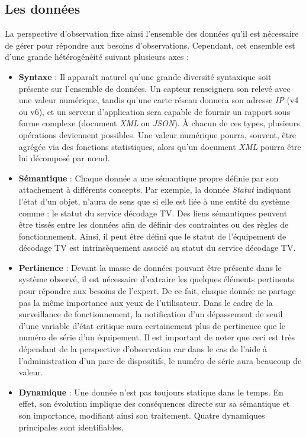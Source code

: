 \subsection{Les données}\label{sec:intro:problematique:data}
La perspective d'observation fixe ainsi l'ensemble des données qu'il est nécessaire de gérer pour répondre aux besoins d'observations. Cependant, cet ensemble est d'une grande hétérogénéité suivant plusieurs axes :
\begin{itemize}
 \item \textbf{Syntaxe} : Il apparaît naturel qu'une grande diversité syntaxique soit présente sur l'ensemble de données. Un capteur renseignera son relevé avec une valeur numérique, tandis qu'une carte réseau donnera son adresse \textit{IP} (v4 ou v6), et un serveur d'application sera capable de fournir un rapport sous forme complexe (document \textit{XML} ou \textit{JSON}). À chacun de ces types, plusieurs opérations deviennent possibles. Une valeur numérique pourra, souvent, être agrégée via des fonctions statistiques, alors qu'un document \textit{XML} pourra être lui décomposé par nœud.
 \item \textbf{Sémantique} : Chaque donnée a une sémantique propre définie par son attachement à différents concepts. Par exemple, la donnée \textit{Statut} indiquant l'état d'un objet, n'aura de sens que si elle est liée à une entité du système comme : le statut du service décodage TV. Des liens sémantiques peuvent être tissés entre les données afin de définir des contraintes ou des règles de fonctionnement. Ainsi, il peut être défini que le statut de l'équipement de décodage TV est intrinsèquement associé au statut du service décodage TV. 
 \item \textbf{Pertinence} : Devant la masse de données pouvant être présente dans le système observé, il est nécessaire d'extraire les quelques éléments pertinents pour répondre aux besoins de l'expert. De ce fait, chaque donnée ne partage pas la même importance aux yeux de l'utilisateur. Dans le cadre de la surveillance de fonctionnement, la notification d'un dépassement de seuil d'une variable d'état critique aura certainement plus de pertinence que le numéro de série d'un équipement. Il est important de noter que ceci est très dépendant de la perspective d'observation car dans le cas de l'aide à l'administration d'un parc de dispositifs, le numéro de série aura beaucoup de valeur.
 \item \textbf{Dynamique} : Une donnée n'est pas toujours statique dans le temps. En effet, son évolution implique des conséquences directe sur sa sémantique et son importance, modifiant ainsi son traitement. Quatre dynamiques principales sont identifiables.

\end{itemize}
